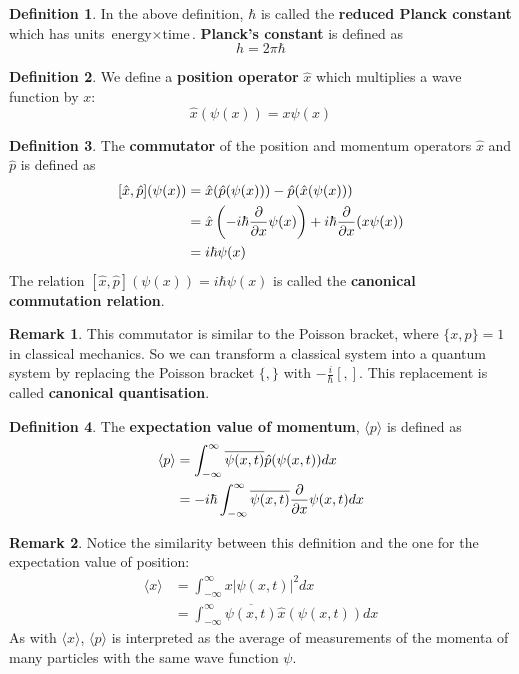 \documentclass[12pt,a4paper]{article}
\theoremstyle{definition}
\newtheorem{definition}{Definition}[subsection]
\newtheorem*{remark}{Remark}
\begin{document}
\begin{definition}
	In the above definition, $\hbar$ is called the \textbf{reduced Planck constant} which has units $\text{energy} \times \text{time}$. \textbf{Planck's constant} is defined as
	\[
		h = 2 \pi \hbar
	\]
\end{definition}

\begin{definition}
	We define a \textbf{position operator} $\hat{x}$ which multiplies a wave function by $x$:
	\[
		\hat{x} (\psi(x)) = x \psi(x)
	\]
\end{definition}

\begin{definition}
	The \textbf{commutator} of the position and momentum operators $\hat{x}$ and $\hat{p}$ is defined as
	\[
		\begin{aligned}
			\relax [\hat{x}, \hat{p}] (\psi(x))
				& = \hat{x} (\hat{p} (\psi(x))) - \hat{p} (\hat{x} (\psi(x))) \\
				& = \hat{x} \left( -i \hbar \diffp{}{x} \psi(x) \right)	+ i \hbar \diffp{}{x} (x \psi(x)) \\
				& = i \hbar \psi(x)
		\end{aligned}
	\]
	The relation $[\hat{x}, \hat{p}] (\psi(x)) = i \hbar \psi(x)$ is called the \textbf{canonical commutation relation}.
\end{definition}

\begin{remark}
	This commutator is similar to the Poisson bracket, where $\{ x, p \} = 1$ in classical mechanics. So we can transform a classical system into a quantum system by replacing the Poisson bracket $\{ , \}$ with $-\frac{i}{\hbar} [,]$. This replacement is called \textbf{canonical quantisation}.
\end{remark}

\begin{definition}
	The \textbf{expectation value of momentum}, $\langle p \rangle$ is defined as
	\[
		\begin{aligned}
			\langle p \rangle
				& = \int_{-\infty}^{\infty} \overline{\psi(x, t)} \hat{p} (\psi(x, t)) dx \\
				& = -i \hbar \int_{-\infty}^{\infty} \overline{\psi(x, t)} \diffp{}{x} \psi(x, t) dx
		\end{aligned}
	\]
\end{definition}

\begin{remark}
	Notice the similarity between this definition and the one for the expectation value of position:
	\[
		\begin{aligned}
			\langle x \rangle
				& = \int_{-\infty}^{\infty} x |\psi(x, t)|^2 dx \\
				& = \int_{-\infty}^{\infty} \overline{\psi(x, t)} \hat{x} (\psi(x, t)) dx
		\end{aligned}
	\]
	As with $\langle x \rangle$, $\langle p \rangle$ is interpreted as the average of measurements of the momenta of many particles with the same wave function $\psi$.
\end{remark}
\end{document}

